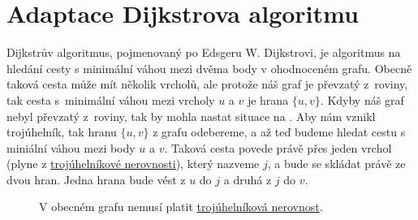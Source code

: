 \section{Adaptace Dijkstrova algoritmu}
\label{sec:dijkstra}

Dijkstrův algoritmus, pojmenovaný po Edsgeru W. Dijkstrovi, je algoritmus na hledání cesty s minimální váhou mezi dvěma body v ohodnoceném grafu. Obecně taková cesta může mít několik vrcholů, ale protože náš graf je převzatý z~roviny, tak cesta s~minimální váhou mezi vrcholy $u$ a $v$ je hrana $\{u, v\}$. Kdyby náš graf nebyl převzatý z~roviny, tak by mohla nastat situace na . Aby nám vznikl trojúhelník, tak hranu $\{u, v\}$ z grafu odebereme, a až teď budeme hledat cestu s miniální váhou mezi body $u$ a $v$. Taková cesta povede právě přes jeden vrchol (plyne z \hyperref[definice:trojuhelnikova_nerovnost]{trojúhelníkové nerovnosti}), který nazveme $j$, a bude se skládat právě ze dvou hran. Jedna hrana bude vést z $u$ do $j$ a druhá z $j$ do $v$. 



\begin{figure}[h]

    \centering
    \caption{V obecném grafu nemusí platit \hyperref[definice:trojuhelnikova_nerovnost]{trojúhelníková nerovnost}.}
    \label{obr:troj_ner_graf}
\end{figure}




